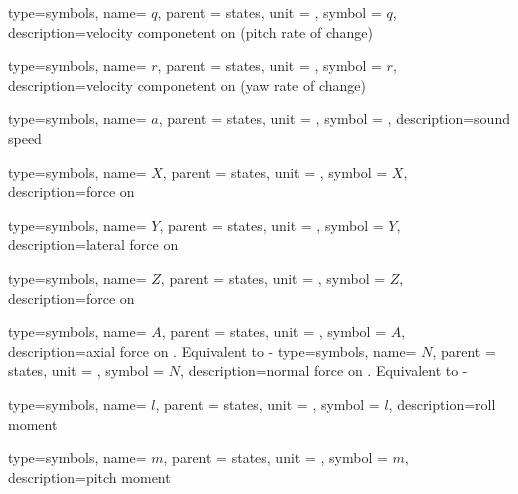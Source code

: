 {type=symbols,
  name= \ensuremath{q},
  parent = {states},
  unit = \unexpanded{\si{\radian\per\second}},
  symbol = \ensuremath{q},
  description={velocity componetent on  (pitch rate of change)}
}

{type=symbols,
  name= \ensuremath{r},
  parent = {states},
  unit = \unexpanded{\si{\radian\per\second}},
  symbol = \ensuremath{r},
  description={velocity componetent on  (yaw rate of change)}
}

{type=symbols,
  name= \ensuremath{a},
  parent = {states},
  unit = \unexpanded{\si{\meter\per\second}},
  symbol = ,
  description={sound speed}
}

{type=symbols,
  name= \ensuremath{X},
  parent = {states},
  unit = \unexpanded{\si{\newton}},
  symbol = \ensuremath{X},
  description={force on }
}

{type=symbols,
  name= \ensuremath{Y},
  parent = {states},
  unit = \unexpanded{\si{\newton}},
  symbol = \ensuremath{Y},
  description={lateral force on }
}



{type=symbols,
  name= \ensuremath{Z},
  parent = {states},
  unit = \unexpanded{\si{\newton}},
  symbol = \ensuremath{Z},
  description={force on }
}

{type=symbols,
  name= \ensuremath{A},
  parent = {states},
  unit = \unexpanded{\si{\newton}},
  symbol = \ensuremath{A},
  description={axial force on . Equivalent to -}
}
{type=symbols,
  name= \ensuremath{N},
  parent = {states},
  unit = \unexpanded{\si{\newton}},
  symbol = \ensuremath{N},
  description={normal force on . Equivalent to -}
}



{type=symbols,
  name= \ensuremath{l},
  parent = {states},
  unit = \unexpanded{\si{\newton\meter}},
  symbol = \ensuremath{l},
  description={roll moment}
}

{type=symbols,
  name= \ensuremath{m},
  parent = {states},
  unit = \unexpanded{\si{\newton\meter}},
  symbol = \ensuremath{m},
  description={pitch moment}
}

